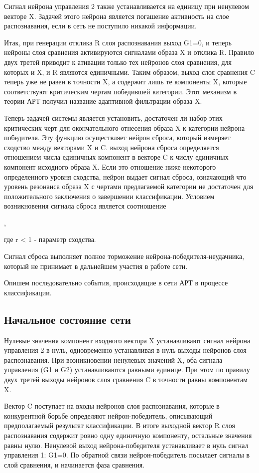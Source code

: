 \documentclass[12pt,a4paper,article]{article}
\begin{document}
Сигнал нейрона управления 2 также устанавливается на единицу при ненулевом векторе X. Задачей этого нейрона является погашение активность на слое распознавания, если в сеть не поступило никакой информации.

Итак, при генерации отклика R слоя распознавания выход G1=0, и теперь нейроны слоя сравнения активируются сигналами образа X и отклика R. Правило двух третей приводит к ативации только тех нейронов слоя сравнения, для которых и X, и R являются единичными. Таким образом, выход слоя сравнения C теперь уже не равен в точности X, а содержит лишь те компоненты X, которые соответствуют критическим чертам победившей категории. Этот механизм в теории АРТ получил название адаптивной фильтрации образа X.

Теперь задачей системы является установить, достаточен ли набор этих критических черт для окончательного отнесения образа X к категории нейрона-победителя. Эту функцию осуществляет нейрон сброса, который измеряет сходство между векторами X и C. выход нейрона сброса определяется отношением числа единичных компонент в векторе C к числу единичных компонент исходного образа X. Если это отношение ниже некоторого определенного уровня сходства, нейрон выдает сигнал сброса, означающий что уровень резонанса образа X с чертами предлагаемой категории не достаточен для положительного заключения о завершении классификации. Условием возникновения сигнала сброса является соотношение

,

где r < 1 - параметр сходства.

Сигнал сброса выполняет полное торможение нейрона-победителя-неудачника, который не принимает в дальнейшем участия в работе сети.

Опишем последовательно события, происходящие в сети АРТ в процессе классификации.

\subsection{Начальное состояние сети} 
Нулевые значения компонент входного вектора X устанавливают сигнал нейрона управления 2 в нуль, одновременно устанавливая в нуль выходы нейронов слоя распознавания. При возникновении ненулевых значений X, оба сигнала управления (G1 и G2) устанавливаются равными единице. При этом по правилу двух третей выходы нейронов слоя сравнения C в точности равны компонентам X.

Вектор C поступает на входы нейронов слоя распознавания, которые в конкурентной борьбе определяют нейрон-победитель, описывающий предполагаемый результат классификации. В итоге выходной вектор R слоя распознавания содержит ровно одну единичную компоненту, остальные значения равны нулю. Ненулевой выход нейрона-победителя устанавливает в нуль сигнал управления 1: G1=0. По обратной связи нейрон-победитель посылает сигналы в слой сравнения, и начинается фаза сравнения.
\end{document}
